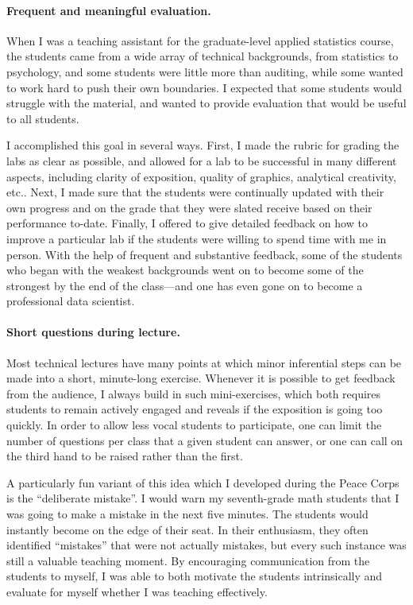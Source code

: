 \paragraph{Frequent and meaningful evaluation.}

When I was a teaching assistant for the graduate-level applied statistics
course, the students came from a wide array of technical backgrounds, from
statistics to psychology, and some students were little more than auditing,
while some wanted to work hard to push their own boundaries.  I expected that
some students would struggle with the material, and wanted to provide evaluation
that would be useful to all students.

I accomplished this goal in several ways. First, I made the rubric for grading
the labs as clear as possible, and allowed for a lab to be successful in many
different aspects, including clarity of exposition, quality of graphics,
analytical creativity, etc..  Next, I made sure that the students were
continually updated with their own progress and on the grade that they were
slated receive based on their performance to-date. Finally, I offered to give
detailed feedback on how to improve a particular lab if the students were
willing to spend time with me in person.  With the help of frequent and
substantive feedback, some of the students who began with the weakest
backgrounds went on to become some of the strongest by the end of the
class---and one has even gone on to become a professional data scientist.


\paragraph{Short questions during lecture.}

Most technical lectures have many points at which minor inferential steps can be
made into a short, minute-long exercise.  Whenever it is possible to get
feedback from the audience, I always build in such mini-exercises, which both
requires students to remain actively engaged and reveals if the exposition is
going too quickly.  In order to allow less vocal students to participate, one
can limit the number of questions per class that a given student can answer, or
one can call on the third hand to be raised rather than the first.

A particularly fun variant of this idea which I developed during the Peace Corps
is the ``deliberate mistake''.  I would warn my seventh-grade math students that
I was going to make a mistake in the next five minutes. The students would
instantly become  on the edge of their seat.  In their enthusiasm, they often
identified ``mistakes'' that were not actually mistakes, but every such instance
was still a valuable teaching moment.  By encouraging communication from the
students to myself, I was able to both motivate the students intrinsically and
evaluate for myself whether I was teaching effectively.

